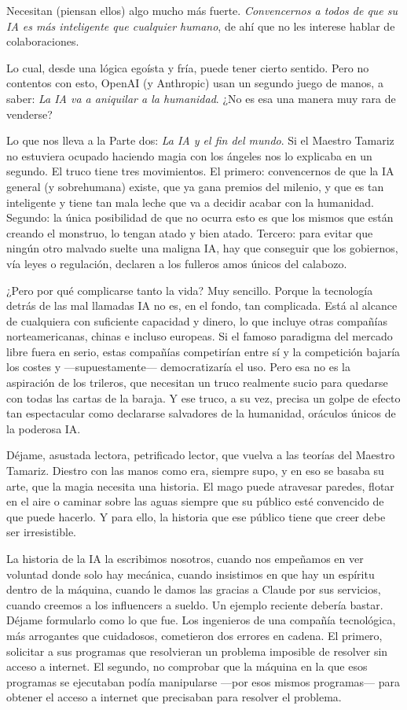 \documentclass[11pt,a4paper]{article}
\begin{document}
Necesitan (piensan ellos) algo mucho más fuerte. \emph{Convencernos a todos de que su IA es más inteligente que cualquier humano}, de ahí que no les interese hablar de colaboraciones.

Lo cual, desde una lógica egoísta y fría, puede tener cierto sentido. Pero no contentos con esto, OpenAI (y Anthropic) usan un segundo juego de manos, a saber: \emph{La IA va a aniquilar a la humanidad}. ¿No es esa una manera muy rara de venderse?

Lo que nos lleva a la Parte dos: \emph{La IA y el fin del mundo}. Si el Maestro Tamariz no estuviera ocupado haciendo magia con los ángeles nos lo explicaba en un segundo. El truco tiene tres movimientos. El primero: convencernos de que la IA general (y sobrehumana) existe, que ya gana premios del milenio, y que es tan inteligente y tiene tan mala leche que va a decidir acabar con la humanidad. Segundo: la única posibilidad de que no ocurra esto es que los mismos que están creando el monstruo, lo tengan atado y bien atado. Tercero: para evitar que ningún otro malvado suelte una maligna IA, hay que conseguir que los gobiernos, vía leyes o regulación, declaren a los fulleros amos únicos del calabozo.

¿Pero por qué complicarse tanto la vida? Muy sencillo. Porque la tecnología detrás de las mal llamadas IA no es, en el fondo, tan complicada. Está al alcance de cualquiera con suficiente capacidad y dinero, lo que incluye otras compañías norteamericanas, chinas e incluso europeas. Si el famoso paradigma del mercado libre fuera en serio, estas compañías competirían entre sí y la competición bajaría los costes y ---supuestamente--- democratizaría el uso. Pero esa no es la aspiración de los trileros, que necesitan un truco realmente sucio para quedarse con todas las cartas de la baraja. Y ese truco, a su vez, precisa un golpe de efecto tan espectacular como declararse salvadores de la humanidad, oráculos únicos de la poderosa IA.

Déjame, asustada lectora, petrificado lector, que vuelva a las teorías del Maestro Tamariz. Diestro con las manos como era, siempre supo, y en eso se basaba su arte, que la magia necesita una historia. El mago puede atravesar paredes, flotar en el aire o caminar sobre las aguas siempre que su público esté convencido de que puede hacerlo. Y para ello, la historia que ese público tiene que creer debe ser irresistible.

La historia de la IA la escribimos nosotros, cuando nos empeñamos en ver voluntad donde solo hay mecánica, cuando insistimos en que hay un espíritu dentro de la máquina, cuando le damos las gracias a Claude por sus servicios, cuando creemos a los influencers a sueldo. Un ejemplo reciente debería bastar. Déjame formularlo como lo que fue. Los ingenieros de una compañía tecnológica, más arrogantes que cuidadosos, cometieron dos errores en cadena. El primero, solicitar a sus programas que resolvieran un problema imposible de resolver sin acceso a internet. El segundo, no comprobar que la máquina en la que esos programas se ejecutaban podía manipularse ---por esos mismos programas--- para obtener el acceso a internet que precisaban para resolver el problema.
\end{document}
